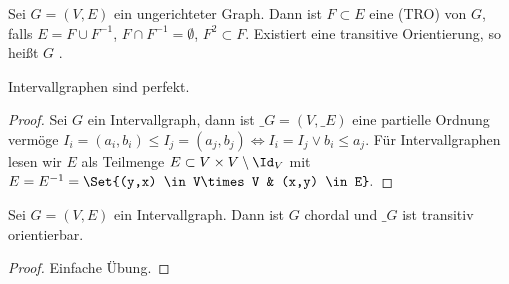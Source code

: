 \begin{df}
    Sei $G = (V, E)$ ein ungerichteter Graph.
    Dann ist $F \subset E$ eine  (TRO) von $G$, falls $E = F \cup F^{-1}$, $F \cap F^{-1} = \emptyset$, $F^2 \subset F$.
    Existiert eine transitive Orientierung, so heißt $G$ .
\end{df}

\begin{st}
    Intervallgraphen sind perfekt.
    \begin{proof}
        Sei $G$ ein Intervallgraph, dann ist $\_G = (V, \_E)$ eine partielle Ordnung vermöge
        \begin{math}
            I_i = (a_i, b_i) \le I_j = (a_j, b_j) \iff I_i = I_j \lor b_i \le a_j.
        \end{math}
        Für Intervallgraphen lesen wir $E$ als Teilmenge $E \subset V \times V \setminus \Id_V$ mit
        \begin{math}
            E = E^{-1} = \Set{(y,x) \in V\times V & (x,y) \in E}.
        \end{math}
    \end{proof}
\end{st}

\begin{lem}
    Sei $G = (V,E)$ ein Intervallgraph.
    Dann ist $G$ chordal und $\_G$ ist transitiv orientierbar.
    \begin{proof}
        Einfache Übung.
    \end{proof}
\end{lem}

